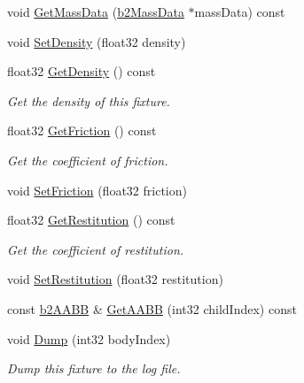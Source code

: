 \begin{DoxyCompactItemize}
void \hyperlink{classb2_fixture_a4532a12e848c5ceb5a3b94cf45b7cbad}{Get\+Mass\+Data} (\hyperlink{structb2_mass_data}{b2\+Mass\+Data} $\ast$mass\+Data) const
\item 
void \hyperlink{classb2_fixture_ad4e1d9323103975c8931d022b952d04a}{Set\+Density} (float32 density)
\item 
\mbox{\label{classb2_fixture_a228861bb1b1d7b2fb6e091401340784e}} 
float32 \hyperlink{classb2_fixture_a228861bb1b1d7b2fb6e091401340784e}{Get\+Density} () const
\begin{DoxyCompactList}\small\item\em Get the density of this fixture. \end{DoxyCompactList}\item 
\mbox{\label{classb2_fixture_a2853d799f299cb1ce76e48261d42a5ad}} 
float32 \hyperlink{classb2_fixture_a2853d799f299cb1ce76e48261d42a5ad}{Get\+Friction} () const
\begin{DoxyCompactList}\small\item\em Get the coefficient of friction. \end{DoxyCompactList}\item 
void \hyperlink{classb2_fixture_ad0cd91eef5858c8ef1d6b62cc2a34ea2}{Set\+Friction} (float32 friction)
\item 
\mbox{\label{classb2_fixture_ac30becb6f936a9cc825952ca2b40aa14}} 
float32 \hyperlink{classb2_fixture_ac30becb6f936a9cc825952ca2b40aa14}{Get\+Restitution} () const
\begin{DoxyCompactList}\small\item\em Get the coefficient of restitution. \end{DoxyCompactList}\item 
void \hyperlink{classb2_fixture_a19c507332e4f7bd04a05f00426f11ee4}{Set\+Restitution} (float32 restitution)
\item 
const \hyperlink{structb2_a_a_b_b}{b2\+A\+A\+BB} \& \hyperlink{classb2_fixture_a158574dc389fec83a05b09ab715c4474}{Get\+A\+A\+BB} (int32 child\+Index) const
\item 
\mbox{\label{classb2_fixture_a57485e73a2063060e320c7176676cd5e}} 
void \hyperlink{classb2_fixture_a57485e73a2063060e320c7176676cd5e}{Dump} (int32 body\+Index)
\begin{DoxyCompactList}\small\item\em Dump this fixture to the log file. \end{DoxyCompactList}\end{DoxyCompactItemize}
